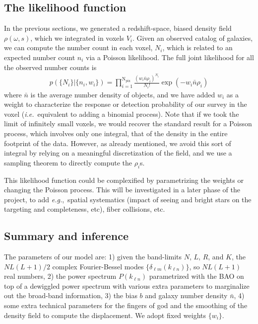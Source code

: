 \documentclass{aastex6}
\newcommand{\ie}{{\textit{i.e.}~}}
\newcommand{\eg}{{\textit{e.g.},~}}
\newcommand{\eqn}[1]{\begin{eqnarray}#1\end{eqnarray}}
\begin{document}
\subsection{The likelihood function}

In the previous sections, we generated a redshift-space, biased density field $\rho(\omega, s)$, which we integrated in voxels $V_i$.
Given an observed catalog of galaxies, we can compute the number count in each voxel, $N_i$, which is related to an expected number count $n_i$ via a Poisson likelihood. 
The full joint likelihood for all the observed number counts is
\eqn{
	p( \{N_i\} |\{ n_i , w_i\}) = \prod_{i=1}^{\mathrm{N}_\mathrm{pix}} \frac{(w_i \bar{n} \rho_i)^{N_i}}{N_i!} \exp(-w_i \bar{n} \rho_i) 
}
where  $\bar{n}$ is the average number density of objects, and we have added $w_i$ as a weight to characterize the response or detection probability of our survey in the voxel (\ie equivalent to adding a binomial process).
Note that if we took the limit of infinitely small voxels, we would recover the standard result for a Poisson process, which involves only one integral, that of the density in the entire footprint of the data.
However, as already mentioned, we avoid this sort of integral by relying on a meaningful discretization of the field, and we use a sampling theorem to directly compute the $\rho_i$s.

This likelihood function could be complexified by parametrizing the weights or changing the Poisson process. 
This will be investigated in a later phase of the project, to add \eg spatial systematics (impact of seeing and bright stars on the targeting and completeness, etc), fiber collisions, etc.



\subsection{Summary and inference}

The parameters of our model are: 1) given the band-limits $N$, $L$, $R$, and $K$, the $NL(L+1)/2$ complex Fourier-Bessel modes $\{\delta_{\ell m}(k_{\ell n})\}$, so $NL(L+1)$ real numbers, 2) the power spectrum $P(k_{\ell n})$ parametrized with the BAO on top of a dewiggled power spectrum with various extra parameters to marginalize out the broad-band information, 3) the bias $b$ and galaxy number density $\bar{n}$, 4) some extra technical parameters for the fingers of god and the smoothing of the density field to compute the displacement.
We adopt fixed weights $\{ w_i \}$.
\end{document}
